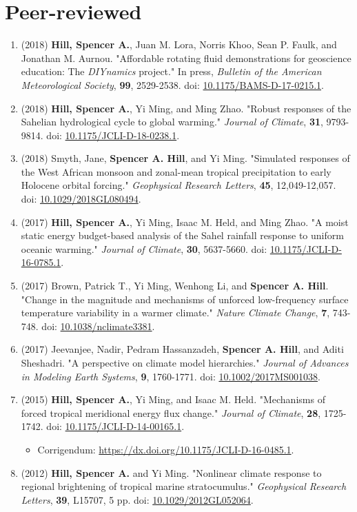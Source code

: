 \documentclass[12pt,letterpaper]{shillcv}
\begin{document}
\section*{Peer-reviewed}
\label{sec:org21bf034}
\begin{enumerate}
\item (2018) \textbf{Hill, Spencer A.}, Juan M. Lora, Norris Khoo, Sean P. Faulk, and
Jonathan M.  Aurnou.  "Affordable rotating fluid demonstrations for
geoscience education: The \emph{DIYnamics} project."  In press, \emph{Bulletin of the
American Meteorological Society}, \textbf{99}, 2529-2538.  doi:
\href{https://doi.org/10.1175/BAMS-D-17-0215.1}{10.1175/BAMS-D-17-0215.1}.
\item (2018) \textbf{Hill, Spencer A.}, Yi Ming, and Ming Zhao.  "Robust responses of the
Sahelian hydrological cycle to global warming."  \emph{Journal of
Climate}, \textbf{31}, 9793-9814.  doi: \href{https://doi.org/10.1175/JCLI-D-18-0238.1}{10.1175/JCLI-D-18-0238.1}.
\item (2018) Smyth, Jane, \textbf{Spencer A. Hill}, and Yi Ming.  "Simulated responses of
the West African monsoon and zonal-mean tropical precipitation to early
Holocene orbital forcing."  \emph{Geophysical Research Letters}, \textbf{45},
12,049-12,057.  doi: \href{https://doi.org/10.1029/2018GL080494}{10.1029/2018GL080494}.
\item (2017) \textbf{Hill, Spencer A.}, Yi Ming, Isaac M. Held, and Ming Zhao.  "A moist
static energy budget-based analysis of the Sahel rainfall response to uniform
oceanic warming."  \emph{Journal of Climate}, \textbf{30}, 5637-5660.  doi:
\href{https://doi.org/10.1175/JCLI-D-16-0785.1}{10.1175/JCLI-D-16-0785.1}.
\item (2017) Brown, Patrick T., Yi Ming, Wenhong Li, and \textbf{Spencer A. Hill}.  "Change
in the magnitude and mechanisms of unforced low-frequency surface temperature
variability in a warmer climate."  \emph{Nature Climate Change}, \textbf{7}, 743-748.
doi: \href{https://doi.org/10.1038/nclimate3381}{10.1038/nclimate3381}.
\item (2017) Jeevanjee, Nadir, Pedram Hassanzadeh, \textbf{Spencer A. Hill}, and Aditi
Sheshadri.  "A perspective on climate model hierarchies."  \emph{Journal
of Advances in Modeling Earth Systems}, \textbf{9}, 1760-1771.  doi: \href{https://doi.org/10.1002/2017MS001038}{10.1002/2017MS001038}.
\item (2015) \textbf{Hill, Spencer A.}, Yi Ming, and Isaac M. Held.  "Mechanisms of forced
tropical meridional energy flux change."  \emph{Journal of Climate}, \textbf{28}, 1725-1742.
doi: \href{http://dx.doi.org/10.1175/JCLI-D-14-00165.1}{10.1175/JCLI-D-14-00165.1}.
\begin{itemize}
\item Corrigendum: \url{https://dx.doi.org/10.1175/JCLI-D-16-0485.1}.
\end{itemize}
\item (2012) \textbf{Hill, Spencer A.} and Yi Ming.  "Nonlinear climate response to regional
brightening of tropical marine stratocumulus."  \emph{Geophysical Research Letters},
\textbf{39}, L15707, 5 pp. doi:
\href{http://dx.doi.org/10.1029/2012GL052064}{10.1029/2012GL052064}.
\end{enumerate}
\end{document}
